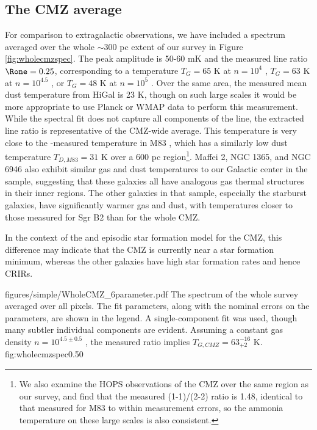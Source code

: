 \subsection{The CMZ average}
For comparison to extragalactic observations, we have included a spectrum
averaged over the whole $\sim300$ pc extent of our survey in Figure
\ref{fig:wholecmzspec}.  The peak amplitude is 50-60 mK and the measured
line ratio $\Rone = 0.25$, corresponding to a temperature $T_G=65$ K at $n=10^4$
\percc, $T_G=63$ K at $n=10^{4.5}$ \percc, or $T_G=48$ K at $n=10^5$ \percc.  
Over the same area, the measured mean dust temperature from HiGal is 23 K,
though on such large scales it would be more appropriate to use Planck or WMAP
data to perform this measurement.
While the spectral fit does not capture all components of the line, the
extracted line ratio is representative of the CMZ-wide average.  This
temperature is very close
to the \ammonia-measured temperature in M83 \citep[56 K;][]{Mangum2013a}, which
has a similarly low dust temperature $T_{D,M83} = 31$ K over a 600 pc
region\footnote{We also examine the HOPS \citep{Walsh2011a} \ammonia
observations of the CMZ over the same region as our \formaldehyde survey, and
find that the measured (1-1)/(2-2) ratio is 1.48, identical to that measured
for M83 to within measurement errors, so the ammonia temperature on these large
scales is also consistent.}.  Maffei 2, NGC 1365, and NGC 6946 also exhibit
similar gas and
dust
temperatures to our Galactic center in the \citet{Mangum2013a} sample,
suggesting that these galaxies all have analogous gas thermal structures in
their inner regions.  The other galaxies in that sample, especially the
starburst galaxies, have significantly warmer gas and dust, with temperatures
closer to those measured for Sgr B2 than for the whole CMZ.

In the context of the \citet{Kruijssen2014c} and \citet{Kruijssen2015a}
episodic star formation model for the CMZ, this difference may indicate that
the CMZ is currently near a star formation minimum, whereas the other galaxies
have high star formation rates and hence CRIRs.

\Figure
{figures/simple/WholeCMZ_6parameter.pdf}
{The spectrum of the whole survey averaged over all pixels.  The fit
parameters, along with the nominal errors on the parameters, are shown in the
legend.  A single-component fit was used, though many subtler individual
components are evident.  Assuming a constant gas density $n=10^{4.5\pm0.5}$
\percc, the measured ratio implies $T_{G,CMZ} = 63^{-16}_{+2}$ K.}
{fig:wholecmzspec}{0.5}{0}

